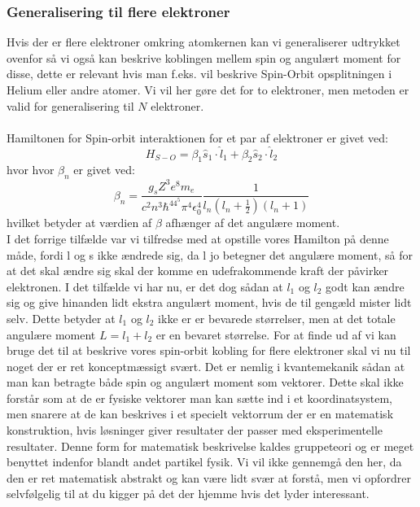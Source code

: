 \documentclass[../../Atom-ogMolekylefysik.tex]{subfiles}
\begin{document}
\subsubsection*{Generalisering til flere elektroner}
Hvis der er flere elektroner omkring atomkernen kan vi generaliserer udtrykket ovenfor så vi også kan beskrive koblingen mellem spin og angulært moment for disse, dette er relevant hvis man f.eks. vil beskrive Spin-Orbit opsplitningen i Helium eller andre atomer. Vi vil her gøre det for to elektroner, men metoden er valid for generalisering til $N$ elektroner.\\
\\
Hamiltonen for Spin-orbit interaktionen for et par af elektroner er givet ved:
\begin{equation}
    H_{S-O}=\beta_{1}\hat{s}_1\cdot\hat{l}_1+\beta_2\hat{s}_2\cdot\hat{l}_2
\end{equation}
hvor
hvor $\beta_n$ er givet ved:
\begin{equation}
    \beta_n=\frac{g_sZ^3e^8m_e}{c^2n^3\hbar^44^5\pi^4\epsilon_0^4}\frac{1}{l_n(l_n+\frac{1}{2})(l_n+1)}
\end{equation}
hvilket betyder at værdien af $\beta$ afhænger af det angulære moment.\\
I det forrige tilfælde var vi tilfredse med at opstille vores Hamilton på denne måde, fordi l og s ikke ændrede sig, da l jo betegner  det angulære moment, så for at det skal ændre sig skal der komme en udefrakommende kraft der påvirker elektronen. I det tilfælde vi har nu, er det dog sådan at $l_1$ og $l_2$ godt kan ændre sig og give hinanden lidt ekstra angulært moment, hvis de til gengæld mister lidt selv. Dette betyder at $l_1$ og $l_2$ ikke er er bevarede størrelser, men at det totale angulære moment $L=l_1+l_2$ er en bevaret størrelse. For at finde ud af vi kan bruge det til at beskrive vores spin-orbit kobling for flere elektroner skal vi nu til noget der er ret konceptmæssigt svært. Det er nemlig i kvantemekanik sådan at man kan betragte både spin og angulært moment som vektorer. Dette skal ikke forstår som at de er fysiske vektorer man kan sætte ind i et koordinatsystem, men snarere at de kan beskrives i et specielt vektorrum der er en matematisk konstruktion, hvis løsninger giver resultater der passer med eksperimentelle resultater. Denne form for matematisk beskrivelse kaldes gruppeteori og er meget benyttet indenfor blandt andet partikel fysik. Vi vil ikke gennemgå den her, da den er ret matematisk abstrakt og kan være lidt svær at forstå, men vi opfordrer selvfølgelig til at du kigger på det der hjemme hvis det lyder interessant.
\end{document}
